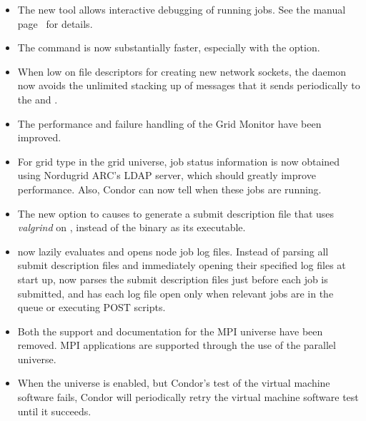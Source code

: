 \begin{itemize}

\item The new  tool allows interactive debugging of running
jobs.  See the manual page~\pageref{man-condor-ssh-to-job} for details.

\item The  command is now substantially faster, 
especially with the  option.

\item When low on file descriptors for creating new network sockets,
the  daemon now avoids the unlimited stacking up of
messages that it sends periodically to the  
and .

\item The performance and failure handling of the Grid Monitor have been
improved.

\item For grid type  in the grid universe,
job status information
is now obtained using Nordugrid ARC's LDAP server, which should greatly
improve performance. Also, Condor can now tell when these jobs are running.

\item The new  option to 
causes  to generate a submit description file that
uses \emph{valgrind} on , instead of the 
binary as its executable.

\item {} now lazily evaluates and opens node job log files.
Instead of parsing all submit description files and 
immediately opening their specified log files at start up,
 now parses
the submit description files just before each job is submitted,
and has each log file open only when relevant jobs are in the queue
or executing POST scripts.

\item Both the support and documentation for the MPI universe have been removed.
MPI applications are supported through the use of the parallel universe.

\item When the  universe is enabled,
but Condor's test of the virtual machine software fails,
Condor will periodically retry the virtual machine software test until it
succeeds.


\end{itemize}
